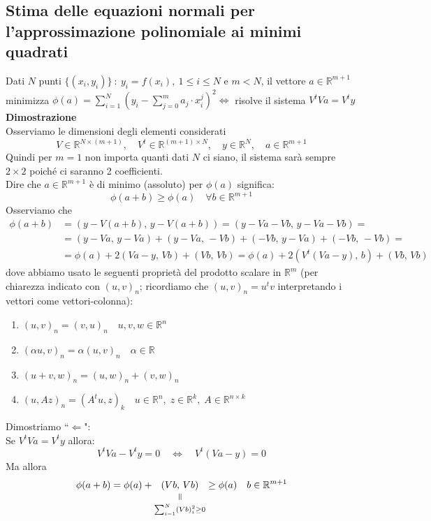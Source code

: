 \subsection{Stima delle equazioni normali per l'approssimazione polinomiale ai minimi quadrati}
Dati $N$ punti $\{ (x_i, y_i) \}\ : \ y_i = f(x_i), \ 1 \leq i \leq N$ e $m < N$, il vettore $a \in \mathbb{R}^{m+1}$\\
minimizza $\phi(a) = \sum\limits_{i=1}^N (y_i - \sum\limits_{j=0}^m a_j \cdot x_i^j)^2 \iff $ risolve il sistema $V^t Va = V^t y$\\
\textbf{Dimostrazione}\\
Osserviamo le dimensioni degli elementi considerati
\[
V \in \mathbb{R}^{N \times (m+1)}, \quad V^t \in \mathbb{R}^{(m+1) \times N}, \quad y \in \mathbb{R}^{N}, \quad a \in \mathbb{R}^{m+1}
\]
Quindi per $m=1$ non importa quanti dati $N$ ci siano, il sistema sarà sempre $2\times2$ poiché ci saranno 2 coefficienti.\\
Dire che $a \in \mathbb{R}^{m+1}$ è di minimo (assoluto) per $\phi(a)$ significa:
\[
\phi(a+b) \geq \phi(a) \quad \forall b \in \mathbb{R}^{m+1}
\]
Osserviamo che
\[ \begin{split}
\phi(a+b) & = (y-V(a+b),\, y-V(a+b)) = 
(y-Va-Vb, \, y-Va-Vb) = \\
& = (y-Va,\, y-Va) + (y-Va, \, -Vb) + (-Vb, \, y-Va) + (-Vb, \, -Vb) = \\
& = \phi(a) + 2(Va-y, \, Vb) + (Vb, \, Vb) = \phi(a) +2(V^t(Va-y), \, b) + (Vb, \, Vb)
\end{split} \]
dove abbiamo usato le seguenti proprietà del prodotto scalare in $\mathbb{R}^{m}$ (per chiarezza indicato con $(u,v)_n$; ricordiamo che $(u,v)_n=u^tv$ interpretando i vettori come vettori-colonna):
\begin{enumerate}
	\item $(u,v)_n=(v,u)_n \quad u,v,w \in \mathbb{R}^{n}$
	\item $(\alpha u,v)_n= \alpha(u,v)_n \quad \alpha \in \mathbb{R}$
	\item $(u+v,w)_n=(u,w)_n+(v,w)_n$
	\item $(u,Az)_n = (A^tu,z)_k \quad u \in \mathbb{R}^{n}, \; z \in \mathbb{R}^{k}, \; A \in \mathbb{R}^{n \times k}$
\end{enumerate}
Dimostriamo ``$\Leftarrow$":\\
 Se $V^t Va=V^t y$ allora:
\[
V^tVa-V^ty=0 \quad \iff \quad V^t(Va-y)=0\]
Ma allora
\[ \begin{split}
\phi(a+b)=\phi(a)+ \equalto{(Vb,\, Vb)}{\sum_{i=1}^{N}(Vb)_i^2 \geq 0} \geq \phi(a) \quad b \in \mathbb{R}^{m+1}
\end{split} \]
